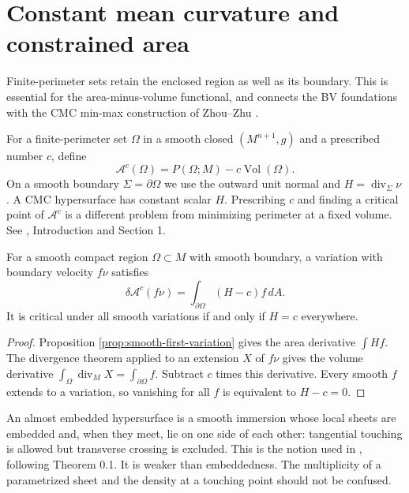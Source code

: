 \chapter{Constant mean curvature and constrained area}\label{sec:cmc-variation}
Finite-perimeter sets retain the enclosed region as well as its boundary. This is essential for the area-minus-volume functional, and connects the BV foundations with the CMC min-max construction of Zhou--Zhu \cite{ZZCMC}.

\begin{definition}\label{def:cmc-functional}
For a finite-perimeter set $\Omega$ in a smooth closed $(M^{n+1},g)$ and a prescribed number $c$, define
\[
 \mathcal A^c(\Omega)=P(\Omega;M)-c\operatorname{Vol}(\Omega).
\]
On a smooth boundary $\Sigma=\partial\Omega$ we use the outward unit normal and $H=\operatorname{div}_\Sigma\nu$. A CMC hypersurface has constant scalar $H$. Prescribing $c$ and finding a critical point of $\mathcal A^c$ is a different problem from minimizing perimeter at a fixed volume. See \cite{ZZCMC}, Introduction and Section 1.
\end{definition}

\begin{proposition}\label{prop:cmc-first-variation}
For a smooth compact region $\Omega\subset M$ with smooth boundary, a variation with boundary velocity $f\nu$ satisfies
\[
 \delta\mathcal A^c(f\nu)=\int_{\partial\Omega}(H-c)f\,dA.
\]
It is critical under all smooth variations if and only if $H=c$ everywhere.
\end{proposition}
\begin{proof}
Proposition \ref{prop:smooth-first-variation} gives the area derivative $\int Hf$. The divergence theorem applied to an extension $X$ of $f\nu$ gives the volume derivative
$\int_\Omega\operatorname{div}_M X=\int_{\partial\Omega}f$.
Subtract $c$ times this derivative. Every smooth $f$ extends to a variation, so vanishing for all $f$ is equivalent to $H-c=0$.
\end{proof}

\begin{definition}\label{def:almost-embedded}
An almost embedded hypersurface is a smooth immersion whose local sheets are embedded and, when they meet, lie on one side of each other: tangential touching is allowed but transverse crossing is excluded. This is the notion used in \cite{ZZCMC}, following Theorem 0.1. It is weaker than embeddedness. The multiplicity of a parametrized sheet and the density at a touching point should not be confused.
\end{definition}

